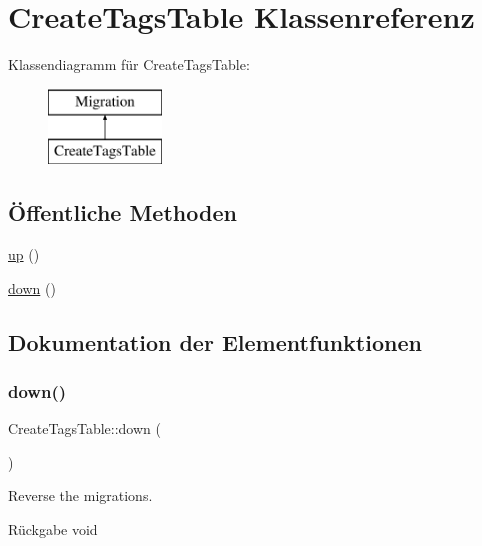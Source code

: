 \hypertarget{classCreateTagsTable}{}\section{Create\+Tags\+Table Klassenreferenz}
\label{classCreateTagsTable}
Klassendiagramm für Create\+Tags\+Table\+:\begin{figure}[H]
\begin{center}
\leavevmode
\includegraphics[height=2.000000cm]{d9/db0/classCreateTagsTable}
\end{center}
\end{figure}
\subsection*{Öffentliche Methoden}
\begin{DoxyCompactItemize}
\item 
\hyperlink{classCreateTagsTable_a39465289ea686c005ecb5801e2feb015}{up} ()
\item 
\hyperlink{classCreateTagsTable_ade9903b71eff088200345e059c48ba08}{down} ()
\end{DoxyCompactItemize}


\subsection{Dokumentation der Elementfunktionen}
\mbox{\label{classCreateTagsTable_ade9903b71eff088200345e059c48ba08}} 
\subsubsection{\texorpdfstring{down()}{down()}}
{\footnotesize\ttfamily Create\+Tags\+Table\+::down (\begin{DoxyParamCaption}{ }\end{DoxyParamCaption})}

Reverse the migrations.

\begin{DoxyReturn}{Rückgabe}
void 
\end{DoxyReturn}
\mbox{\label{classCreateTagsTable_a39465289ea686c005ecb5801e2feb015}} 
